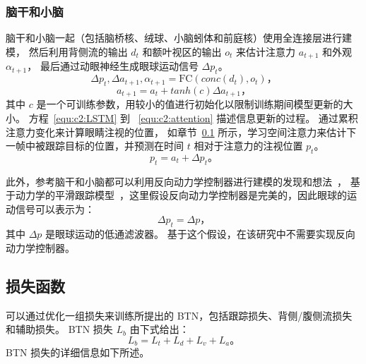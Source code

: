\subsubsection{脑干和小脑}
脑干和小脑一起（包括脑桥核、绒球、小脑蚓体和前庭核）使用全连接层进行建模，
然后利用背侧流的输出 $d_t$ 和额叶视区的输出 $o_t$ 来估计注意力 $a_{t+1}$ 和外观 $\alpha_{t+1}$，
最后通过动眼神经生成眼球运动信号 $\Delta p_t$。
\begin{equation} \label{equ:c2:FC}
\Delta p_t, \Delta a_{t+1}, \alpha_{t+1} = \text{FC}(conc(d_t), o_t) \mbox{，}
\end{equation}
\begin{equation} \label{equ:c2:attention}
a_{t+1} = a_t + tanh(c) \Delta a_{t+1} \mbox{，}
\end{equation}
其中 $c$ 是一个可训练参数，用较小的值进行初始化以限制训练期间模型更新的大小。
方程~\ref{equ:c2:LSTM} 到 ~\ref{equ:c2:attention} 描述信息更新的过程。
通过累积注意力变化来计算眼睛注视的位置，
如章节~\ref{sec:loss} 所示，学习空间注意力来估计下一帧中被跟踪目标的位置，并预测在时间 $t$ 相对于注意力的注视位置 $p_t$。
\begin{equation}
p_t = a_t + \Delta p_t \mbox{。}
\end{equation}

此外，参考脑干和小脑都可以利用反向动力学控制器进行建模的发现和想法~\cite{b9,purkinje_IDC}，
基于动力学的平滑跟踪模型~\cite{b9}，这里假设反向动力学控制器是完美的，因此眼球的运动信号可以表示为：
\begin{equation}
\Delta p_t = \Delta p \mbox{，}
\end{equation}
其中 $\Delta p$ 是眼球运动的低通滤波器。
基于这个假设，在该研究中不需要实现反向动力学控制器。



\subsection{损失函数} \label{sec:loss}
可以通过优化一组损失来训练所提出的 BTN，包括跟踪损失、背侧/腹侧流损失和辅助损失。
BTN 损失 $L_{b}$ 由下式给出：
\begin{equation}
L_{b} = L_t + L_d + L_v + L_a \mbox{。}
\end{equation}
BTN 损失的详细信息如下所述。

